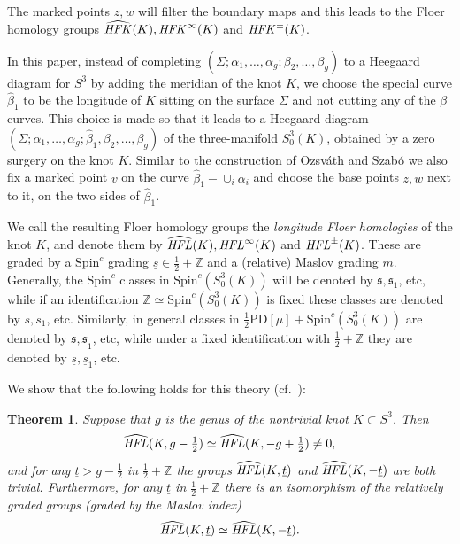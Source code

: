 \documentclass{gtart_h}
\newtheorem{thm}{Theorem}[section]
\theoremstyle{definition}
\newcommand{\ut}{\underline{t}}
\newcommand\relspinc{\underline{\spinc}}
\newcommand{\spinc}{\mathfrak s}
\newcommand\HFK{\text{\it HFK\/}}
\newcommand\HFL{\text{\it HFL\/}}
\newcommand{\Z}{\mathbb{Z}}
\newcommand{\SpinC}{{\mathrm{Spin}}^c}
\begin{document}
The marked points $z,w$ will filter the boundary maps and this leads to the Floer homology
groups $\widehat{\HFK}(K),\HFK^\infty(K)$ and $\HFK^\pm(K)$.

In this paper, instead of completing
$(\Sigma;\alpha_1,\ldots,\alpha_g;\beta_2,\ldots,\beta_g)$
to a Heegaard diagram for $S^3$ by adding the meridian of the knot $K$, we choose the special
curve $\hat \beta_1$ to be the longitude of  $K$ sitting on the surface $\Sigma$
and not cutting any of the $\beta$ curves. This choice is made so that it
leads to a Heegaard diagram
$(\Sigma;\alpha_1,\ldots,\alpha_g;\hat \beta_1,\beta_2,\ldots,\beta_g)$ of the three-manifold
$S^3_0(K)$, obtained by a zero surgery on the knot $K$. Similar to the construction of
Ozsv\'ath and Szab\'o we also fix a marked point $v$ on the curve $\hat \beta_1 -\cup_i
\alpha_i$ and choose the base points $z,w$ next to it, on the two sides of $\hat \beta_1$.

We call the resulting Floer homology groups the \emph{longitude Floer homologies} of the
knot $K$, and  denote them by $\widehat{\HFL}(K),\HFL^\infty(K)$ and $\HFL^\pm(K)$. These are
graded by a $\SpinC$ grading $\underline{s}\in \tfrac{1}{2}+\mathbb{Z}$ and a (relative)
Maslov grading $m$. Generally, the $\SpinC$ classes in
$\SpinC(S^3_0(K))$ will be denoted by $\spinc, \spinc_1$, etc, while
if an identification $\Z \simeq \SpinC(S^3_0(K))$ is fixed these
classes are denoted by $s,s_1$, etc.  Similarly, in general classes in
$\tfrac{1}{2}\text{PD}[\mu]+\SpinC(S^3_0(K))$ are denoted by
$\relspinc,\relspinc_1$, etc, while under a fixed identification with
$\tfrac{1}{2}+\Z$ they are denoted by $\underline{s},\underline{s}_1$,
etc.

We show that the following holds for this theory (cf.\ \cite{OS-genus}):

\begin{thm}
{ Suppose that $g$ is the genus of the nontrivial knot $K\subset S^3$. Then
\begin{displaymath}
\widehat{\HFL}(K,g-\tfrac{1}{2})\simeq \widehat{\HFL}(K,-g+\tfrac{1}{2})\neq 0,
\end{displaymath}
and for any $\ut>g-\tfrac{1}{2}$ in $\tfrac{1}{2}+\mathbb{Z}$ the groups
$\widehat{\HFL}(K,\ut)$ and $\widehat{\HFL}(K,-\ut)$ are both trivial. Furthermore,
for any $\ut$ in $\tfrac{1}{2}+\mathbb{Z}$ there is an isomorphism of the
relatively graded groups (graded by the Maslov index)
\begin{displaymath}
\widehat{\HFL}(K,\ut)\simeq \widehat{\HFL}(K,-\ut).
\end{displaymath}
}
\end{thm}
\end{document}
